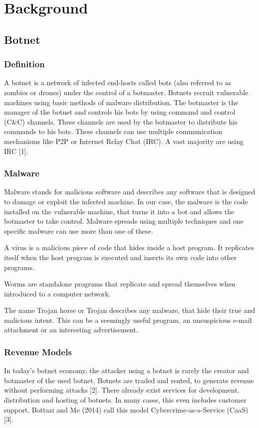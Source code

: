 		
\section{Background}
	\subsection{Botnet}
		\subsubsection{Definition}
			A botnet is a network of infected end-hosts called bots (also referred to as zombies or drones) under the control of a botmaster. Botnets recruit vulnerable machines using basic methods of malware distribution. The botmaster is the manager of the botnet and controls his bots by using command and control (C\&C) channels. These channels are used by the botmaster to distribute his commands to his bots. These channels can use multiple communication mechanisms like P2P or Internet Relay Chat (IRC). A vast majority are using IRC [1].
			
		\subsubsection{Malware}
Malware stands for malicious software and describes any software that is designed to damage or exploit the infected machine. In our case, the malware is the code installed on the vulnerable machine, that turns it into a bot and allows the botmaster to take control.
Malware spreads using multiple techniques and one specific malware can use more than one of these.

A virus is a malicious piece of code that hides inside a host program. It replicates itself when the host program is executed and inserts its own code into other programs.

Worms are standalone programs that replicate and spread themselves when introduced to a computer network.

The name Trojan horse or Trojan describes any malware, that hide their true and malicious intent. This can be a seemingly useful program, an unsuspicious e-mail attachment or an interesting advertisement.


		\subsubsection{Revenue Models}
In today's botnet economy, the attacker using a botnet is rarely the creator and botmaster of the used botnet. Botnets are traded and rented, to generate revenue without performing attacks [2]. There already exist services for development, distribution and hosting of botnets. In many cases, this even includes customer support. Bottazi and Me (2014) call this model Cybercrime-as-a-Service (CaaS) [3].

